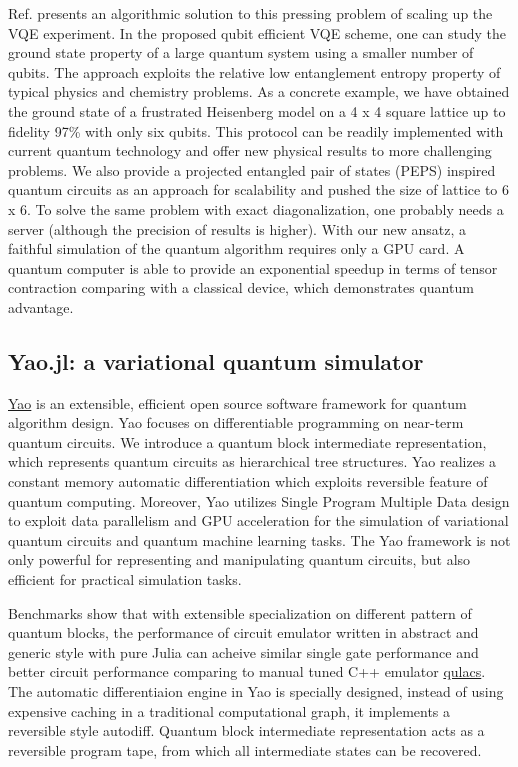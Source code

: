 \documentclass[aps,longbibliography,english,superscriptaddress]{revtex4-1}
\begin{document}
Ref.\cite{Liu2019} presents an algorithmic solution to this pressing problem of scaling up the VQE experiment.  In the proposed qubit efficient VQE scheme, one can study the ground state property of a large quantum system using a smaller number of qubits. The approach exploits the relative low entanglement entropy property of typical physics and chemistry problems. As a concrete example, we have obtained the ground state of a frustrated Heisenberg model on a 4 x 4 square lattice up to fidelity 97\% with only six qubits. This protocol can be readily implemented with current quantum technology and offer new physical results to more challenging problems. We also provide a projected entangled pair of states (PEPS) inspired quantum circuits as an approach for scalability and pushed the size of lattice to 6 x 6.
To solve the same problem with exact diagonalization, one probably needs a server (although the precision of results is higher). With our new ansatz, a faithful simulation of the quantum algorithm requires only a GPU card. A quantum computer is able to provide an exponential speedup in terms of tensor contraction comparing with a classical device, which demonstrates quantum advantage.

\subsection{Yao.jl: a variational quantum simulator}
\href{https://github.com/QuantumBFS/Yao.jl}{Yao} is an extensible, efficient open source software framework for quantum algorithm design. Yao focuses on differentiable programming on near-term quantum circuits. 
We introduce a quantum block intermediate representation, which represents quantum circuits as hierarchical tree structures. 
Yao realizes a constant memory automatic differentiation which exploits reversible feature of quantum computing. 
Moreover, Yao utilizes Single Program Multiple Data design to exploit data parallelism and GPU acceleration for the simulation of variational quantum circuits and quantum machine learning tasks. 
The Yao framework is not only powerful for representing and manipulating quantum circuits, but also efficient for practical simulation tasks. 

Benchmarks show that with extensible specialization on different pattern of quantum blocks, the performance of
circuit emulator written in abstract and generic style with pure Julia can acheive similar single gate performance and
better circuit performance comparing to manual tuned C++ emulator \href{https://github.com/qulacs/qulacs}{qulacs}.
The automatic differentiaion engine in Yao is specially designed, instead of using expensive caching in a traditional computational graph, it implements a reversible style autodiff.
Quantum block intermediate representation acts as a reversible program tape, from which all intermediate states can be recovered.
\end{document}
